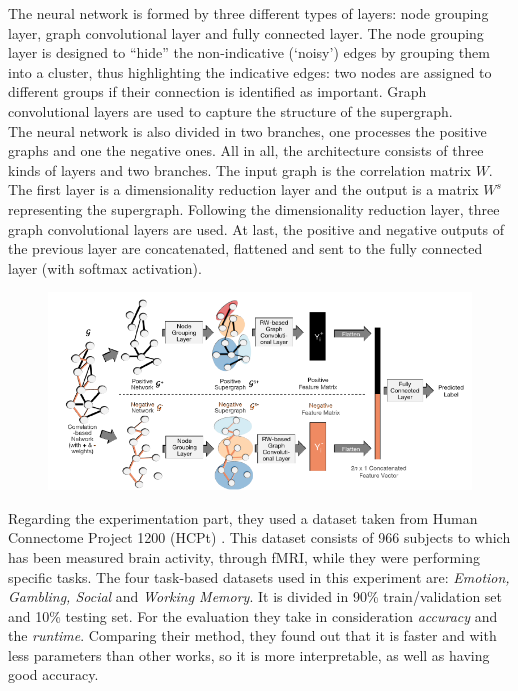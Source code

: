 The neural network is formed by three different types of layers: node grouping layer, graph convolutional layer and fully connected layer. The node grouping layer is designed to “hide” the non-indicative (‘noisy’) edges by grouping them into a cluster, thus highlighting the indicative edges: two nodes are assigned to different groups if their connection is identified as important.
Graph convolutional layers are used to capture the structure of the supergraph.
\\

The neural network is also divided in two branches, one processes the positive graphs and one the negative ones. 
All in all, the architecture consists of three kinds of layers and two branches. 
The input graph is the correlation matrix $W$. The first layer is a dimensionality reduction layer and the output is a matrix $W^{s}$ representing the supergraph. Following the dimensionality reduction layer, three graph convolutional layers are used. At last, the positive and negative outputs of the previous layer are concatenated, flattened and sent to the fully connected layer (with softmax activation).

\begin{figure}[htbp]
	\centering
	\includegraphics[scale=0.8]{Immagini/Groupinn1.PNG}
	\caption{\label{fig:diagram5}}
\end{figure}

Regarding the experimentation part, they used a dataset taken from Human Connectome Project 1200 (HCPt) \cite{hcp}. 
This dataset consists of 966 subjects to which has been measured brain activity, through fMRI, while they were performing specific tasks. The four task-based datasets used in this experiment are: \textit{Emotion, Gambling, Social} and \textit{Working Memory}. It is divided in 90\% train/validation set and 10\% testing set. For the evaluation they take in consideration \textit{accuracy} and the \textit{runtime}. Comparing their method, they found out that it is faster and with less parameters than other works, so it is more interpretable, as well as having good accuracy.
\\

